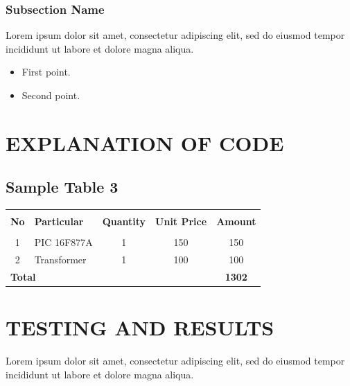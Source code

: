 \documentclass[12pt,a4paper]{report}
\begin{document}
\subsection{Subsection Name}
Lorem ipsum dolor sit amet, consectetur adipiscing elit, sed do eiusmod tempor incididunt ut labore et dolore magna aliqua. 

\begin{itemize}
\item First point.
\item Second point.
\end{itemize}


\chapter{EXPLANATION OF CODE}


\section{Sample Table 3}

\begin{table}[h]
\begin{center}
\begin{tabular}{|c|l|c|c|c|}
 \hline
   &                          &          &            &        \\ 
 \textbf{No} & \textbf{Particular} & \textbf{Quantity} & \textbf{Unit Price} & \textbf{Amount} \\ 
   &                          &          &            &        \\ \hline
1  & PIC 16F877A              & 1        & 150        & 150    \\ \hline
2  & Transformer              & 1        & 100        & 100    \\ \hline
\multicolumn{4}{|l}{\textbf{Total}}               \vline              & \textbf{1302} \\  \hline    
\end{tabular}
\end{center}
\end{table}

\chapter{TESTING AND RESULTS}
\thispagestyle{empty}
Lorem ipsum dolor sit amet, consectetur adipiscing elit, sed do eiusmod tempor incididunt ut labore et dolore magna aliqua.  
\end{document}
